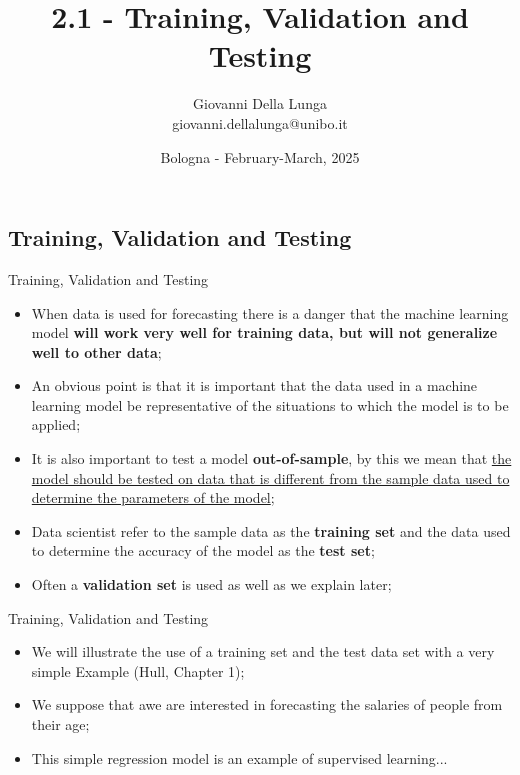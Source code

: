 \documentclass[11pt]{beamer}
\author{Giovanni Della Lunga\\{\footnotesize giovanni.dellalunga@unibo.it}}
\title{2.1 - Training, Validation and Testing}
\subtitle{} %
\institute{Introduction to Machine Learning for Finance}
\date{Bologna - February-March, 2025}
\begin{document}
\begin{frame}
\titlepage
\end{frame}

\AtBeginSubsection{\frame{\subsectionpage}}


%
\subsection[subsection]{Training, Validation and Testing}
%
\begin{frame}{Training, Validation and Testing}
	\begin{itemize}
		\item When data is used for forecasting there is a danger that the machine learning model \textbf{will work very well for training data, but will not generalize well to other data};
		\item An obvious point is that it is important that the data used in a machine learning model be representative of the situations to which the model is to be applied;
		\item It is also important to test a model \textbf{out-of-sample}, by this we mean that \ul{the model should be tested on data that is different from the sample data used to determine the parameters of the model};
		\item Data scientist refer to the sample data as the \textbf{training set} and the data used to determine the accuracy of the model as the \textbf{test set};
		\item Often a \textbf{validation set} is used as well as we explain later;
	\end{itemize}
\end{frame}
\begin{frame}{Training, Validation and Testing}
\begin{itemize}
\item We will illustrate the use of a training set and the test data set with a very simple Example (Hull, Chapter 1);
\item We suppose that awe are interested in forecasting the salaries of people from their age;
\item This simple regression model is an example of supervised learning...
\end{itemize}
\end{frame}
\end{document}

